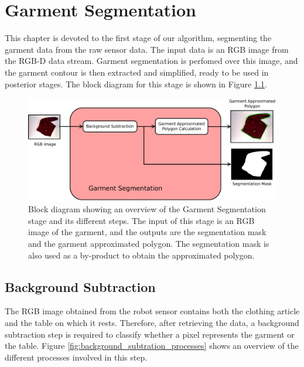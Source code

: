 \chapter{Garment Segmentation}
\label{garment_segmentation}

This chapter is devoted to the first stage of our algorithm, segmenting the garment data from the raw sensor data. The input data is an RGB image from the RGB-D data stream. Garment segmentation is perfomed over this image, and the garment contour is then extracted and simplified, ready to be used in posterior stages. The block diagram for this stage is shown in Figure \ref{fig:garment_segmentation_blocks}.

\begin{figure}[thpb]
    \centering
    \includegraphics[width=\textwidth]
    {figures/Garment-segmentation-diagram.pdf}
    \caption[Block diagram showing an overview of the Garment Segmentation stage and its different steps.]
    {Block diagram showing an overview of the Garment Segmentation stage and its different steps. The input of this stage is an RGB image of the garment, and the outputs are the segmentation mask and the garment approximated polygon. The segmentation mask is also used as a by-product to obtain the approximated polygon.}
    \label{fig:garment_segmentation_blocks}
\end{figure}


\section{Background Subtraction}
\label{background_subtraction}

The RGB image obtained from the robot sensor contains both the clothing article and the table on which it rests. Therefore, after retrieving the data, a background subtraction step is required to classify whether a pixel represents the garment or the table. Figure \ref{fig:background_subtration_processes} shows an overview of the different processes involved in this step.


